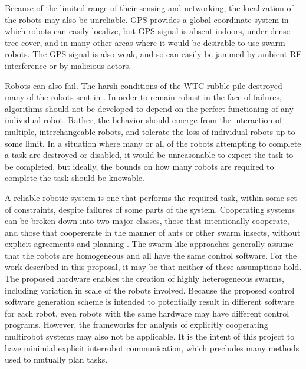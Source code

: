 \documentclass[]{article}
\begin{document}
Because of the limited range of their sensing and networking, the localization of the robots may also be unreliable. 
GPS provides a global coordinate system in which robots can easily localize, but GPS signal is absent indoors, under dense tree cover, and in many other areas where it would be desirable to use swarm robots. 
The GPS signal is also weak, and so can easily be jammed by ambient RF interference or by malicious actors. 

Robots can also fail. 
The harsh conditions of the WTC rubble pile destroyed many of the robots sent in \cite{Micire02analysisof}.
In order to remain robust in the face of failures, algorithms should not be developed to depend on the perfect functioning of any individual robot. 
Rather, the behavior should emerge from the interaction of multiple, interchangeable robots, and tolerate the loss of individual robots up to some limit. 
In a situation where many or all of the robots attempting to complete a task are destroyed or disabled, it would be unreasonable to expect the task to be completed, but ideally, the bounds on how many robots are required to complete the task should be knowable. 

A reliable robotic system is one that performs the required task, within some set of constraints, despite failures of some parts of the system. 
Cooperating systems can be broken down into two major classes, those that intentionally cooperate, and those that coopererate in the manner of ants or other swarm insects, without explicit agreements and planning \cite{parker1998alliance}.
The swarm-like approaches generally assume that the robots are homogeneous and all have the same control software. 
For the work described in this proposal, it may be that neither of these assumptions hold. 
The proposed hardware enables the creation of highly heterogeneous swarms, including variation in scale of the robots involved. 
Because the proposed control software generation scheme is intended to potentially result in different software for each robot, even robots with the same hardware may have different control programs. 
However, the frameworks for analysis of explicitly cooperating multirobot systems may also not be applicable. 
It is the intent of this project to have minimial explicit interrobot communication, which precludes many methods used to mutually plan tasks. 

\end{document}

